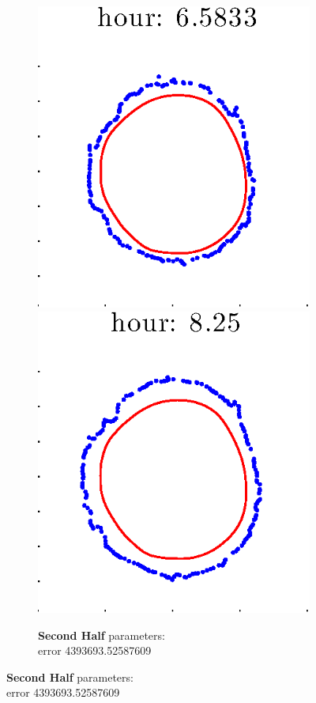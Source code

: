 \documentclass[12pt]{article}
\begin{document}
\begin{figure}[h!]
\begin{subfigure}[b]{.3\textwidth}
		\includegraphics[height=.15\textheight]{Pos0/full/second5.eps}
		\includegraphics[height=.15\textheight]{Pos0/full/second6.eps}
		\caption{\textbf{Second Half} parameters: \\error 4393693.52587609}
	\end{subfigure}
\end{figure}
\end{document}
